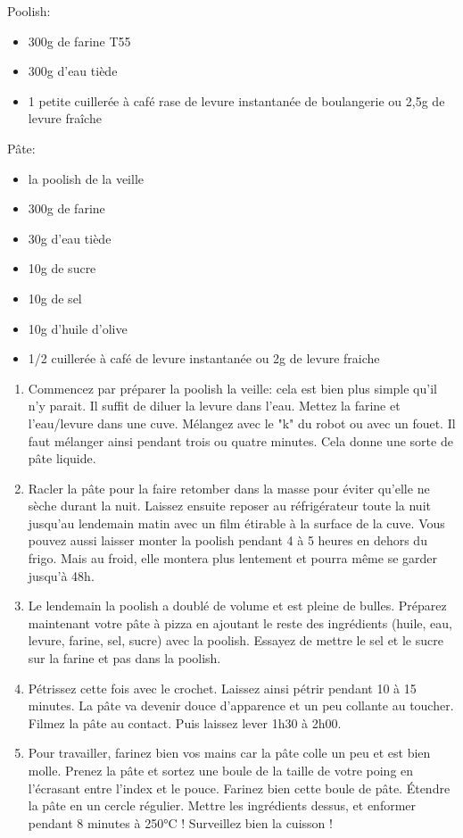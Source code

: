 \bigskip
{}
{}{Poolish:
\begin{itemize}
	\item 300g de farine T55
 	\item 300g d'eau tiède
	\item 1 petite cuillerée à café rase de levure instantanée de boulangerie ou 2,5g de levure fraîche
\end{itemize}

Pâte:
\begin{itemize}
	\item la poolish de la veille
	\item 300g de farine
	\item 30g d'eau tiède
	\item 10g de sucre
	\item 10g de sel
	\item 10g d'huile d'olive
	\item 1/2 cuillerée à café de levure instantanée ou 2g de levure fraiche
\end{itemize}}
{\begin{enumerate}
	\item Commencez par préparer la poolish la veille: cela est bien plus simple qu'il n'y parait. Il suffit de diluer la levure dans l'eau. Mettez la farine et l'eau/levure dans une cuve. Mélangez avec le "k" du robot ou avec un fouet. Il faut mélanger ainsi pendant trois ou quatre minutes. Cela donne une sorte de pâte liquide. 
	\item Racler la pâte pour la faire retomber dans la masse pour éviter qu'elle ne sèche durant la nuit. Laissez ensuite reposer au réfrigérateur toute la nuit jusqu'au lendemain matin avec un film étirable à la surface de la cuve. Vous pouvez aussi laisser monter la poolish pendant 4 à 5 heures en dehors du frigo. Mais au froid, elle montera plus lentement et pourra même se garder jusqu'à 48h.
	\item Le lendemain la poolish a doublé de volume et est pleine de bulles. Préparez maintenant votre pâte à pizza en ajoutant le reste des ingrédients (huile, eau, levure, farine, sel, sucre) avec la poolish. Essayez de mettre le sel et le sucre sur la farine et pas dans la poolish.
	\item Pétrissez cette fois avec le crochet. Laissez ainsi pétrir pendant 10 à 15 minutes. La pâte va devenir douce d'apparence et un peu collante au toucher. Filmez la pâte au contact. Puis laissez lever 1h30 à 2h00.
	\item Pour travailler, farinez bien vos mains car la pâte colle un peu et est bien molle. Prenez la pâte et sortez une boule de la taille de votre poing en l'écrasant entre l'index et le pouce. Farinez bien cette boule de pâte. Étendre la pâte en un cercle régulier. Mettre les ingrédients dessus, et enformer pendant 8 minutes à 250°C ! Surveillez bien la cuisson !
\end{enumerate}}

